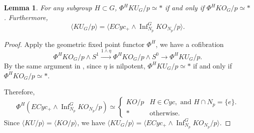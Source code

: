 \documentclass{amsart}
\theoremstyle{plain}
\newtheorem{lemma}[theorem]{Lemma}
\theoremstyle{definition}
\theoremstyle{remark}
\begin{document}
\begin{lemma}\label{lem:geometric fixed KO}
    For any subgroup $H\subset G$, $\Phi^H KU_G/p\simeq \ast$ if and only if $\Phi^H KO_G/p\simeq \ast$. Furthermore, 
    \[
    \langle KU_G/p\rangle=\langle  ECyc_+\wedge \operatorname{Inf}_{N_p}^G KO_{N_p}/p \rangle.
    \]
\end{lemma}
\begin{proof}
    Apply the geometric fixed point functor $\Phi^H$, we have a cofibration
    \[
    \Phi^H KO_G/p\wedge S^1\overset{1\wedge\eta}{\longrightarrow} \Phi^H KO_G/p \wedge S^0\longrightarrow \Phi^H KU_G/p.
    \]
    By the same argument in , since $\eta$ is nilpotent, $\Phi^H KU_G/p\simeq \ast$ if and only if $\Phi^H KO_G/p\simeq \ast$. 

    Therefore, 
    \[
    \Phi^H(ECyc_+\wedge \operatorname{Inf}_{N_p}^G KO_{N_p}/p)\simeq \begin{cases}
        KO/p & H\in Cyc, \text{ and } H\cap N_p=\{e\}.\\
        \ast & \text{otherwise.}
    \end{cases}
    \]
    Since $\langle KU/p\rangle=\langle  KO/p \rangle$, we have $\langle KU_G/p\rangle=\langle  ECyc_+\wedge \operatorname{Inf}_{N_p}^G KO_{N_p}/p \rangle$.
\end{proof}
\end{document}
